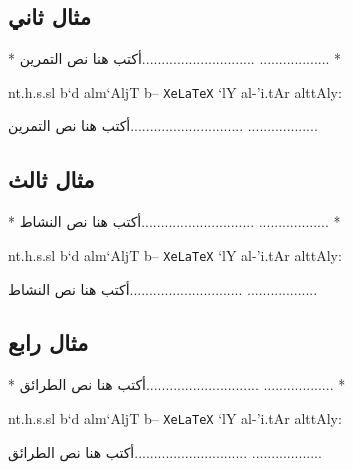 \documentclass[8pt,a4paper]{article}
\begin{document}
\subsection*{مثال ثاني}
\begin{arab}
\begin{boxlis}
\begin{nabox}[style=tamryn]
*\textarabic{\bantii
أكتب هنا نص التمرين.............................
..................   }*

\end{nabox}
\end{boxlis}
nt.h.s.sl b`d alm`AljT b-- \texttt{XeLaTeX}
`lY al-'i.tAr alttAly:
\end{arab}
\begin{nabox}[style=tamryn]
أكتب هنا نص التمرين.............................
..................
\end{nabox}
\subsection*{مثال ثالث}
\begin{arab}
\begin{boxlis}
\begin{nabox}[style=nachat]
*\textarabic{\bantii
أكتب هنا نص النشاط.............................
..................   }*

\end{nabox}
\end{boxlis}
nt.h.s.sl b`d alm`AljT b-- \texttt{XeLaTeX}
`lY al-'i.tAr alttAly:
\end{arab}
\begin{nabox}[style=nachat]
أكتب هنا نص النشاط.............................
..................
\end{nabox}
\subsection*{مثال رابع}
\begin{arab}
\begin{boxlis}
\begin{nabox}[style=tryqt,pluriel,name={\textarabic{*\textarabic{\bantii
حساب إتجاه تغير متتاليية }*}}]
*\textarabic{\bantii
أكتب هنا نص الطرائق.............................
..................   }*

\end{nabox}
\end{boxlis}
nt.h.s.sl b`d alm`AljT b-- \texttt{XeLaTeX}
`lY al-'i.tAr alttAly:
\end{arab}
\begin{nabox}[style=tryqt,pluriel,name={\textarabic{
حساب إتجاه تغير متتاليية }}]
أكتب هنا نص الطرائق.............................
..................
\end{nabox}
\end{document}
